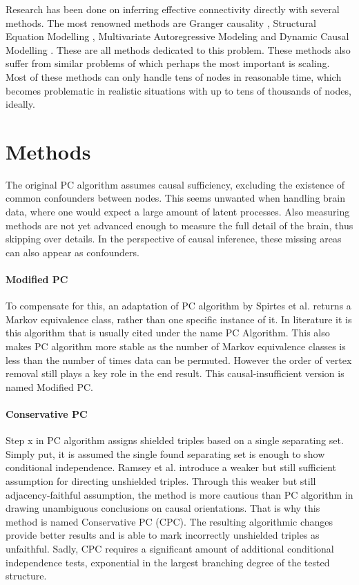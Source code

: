 \documentclass[a4paper, 10pt, english, twocolumn]{article}
\begin{document}
Research has been done on inferring effective connectivity directly with several methods.
The most renowned methods are Granger causality \cite{roebroeck2005}, Structural Equation Modelling \cite{mclntosh1994}, Multivariate Autoregressive Modeling \cite{harrison2003} and Dynamic Causal Modelling \cite{friston2003}.
These are all methods dedicated to this problem.
These methods also suffer from similar problems of which perhaps the most important is scaling.
Most of these methods can only handle tens of nodes in reasonable time, which becomes problematic in realistic situations with up to tens of thousands of nodes, ideally.


\section{Methods}
The original PC algorithm assumes causal sufficiency, excluding the existence of common confounders between nodes.
This seems unwanted when handling brain data, where one would expect a large amount of latent processes.
Also measuring methods are not yet advanced enough to measure the full detail of the brain, thus skipping over details.
In the perspective of causal inference, these missing areas can also appear as confounders.

\paragraph{Modified PC}
To compensate for this, an adaptation of PC algorithm by Spirtes et al. returns a Markov equivalence class, rather than one specific instance of it.
In literature it is this algorithm that is usually cited under the name PC Algorithm.
This also makes PC algorithm more stable as the number of Markov equivalence classes is less than the number of times data can be permuted.
However the order of vertex removal still plays a key role in the end result.
This causal-insufficient version is named Modified PC.

\paragraph{Conservative PC}
Step x in PC algorithm assigns shielded triples based on a single separating set. %
Simply put, it is assumed the single found separating set is enough to show conditional independence. 
Ramsey et al. \cite{ramsey2012} introduce a weaker but still sufficient assumption for directing unshielded triples.
Through this weaker but still adjacency-faithful assumption, the method is more cautious than PC algorithm in drawing unambiguous conclusions on causal orientations.
That is why this method is named Conservative PC (CPC).
The resulting algorithmic changes provide better results and is able to mark incorrectly unshielded triples as unfaithful.
Sadly, CPC requires a significant amount of additional conditional independence tests, exponential in the largest branching degree of the tested structure.
\end{document}
